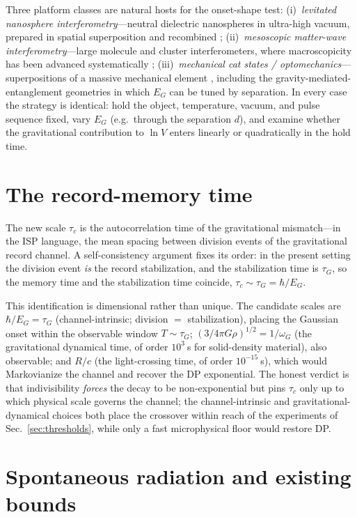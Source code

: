\documentclass[aps,pra,preprint,amsmath,amssymb,nofootinbib,superscriptaddress]{revtex4-2}
\begin{document}
Three platform classes are natural hosts for the onset-shape test:
(i)~\emph{levitated nanosphere interferometry}---neutral dielectric nanospheres
in ultra-high vacuum, prepared in spatial superposition and recombined
\cite{arndt2014}; (ii)~\emph{mesoscopic matter-wave interferometry}---large
molecule and cluster interferometers, where macroscopicity has been advanced
systematically \cite{arndt2014,nimmrichter2013}; (iii)~\emph{mechanical cat
states / optomechanics}---superpositions of a massive mechanical element
\cite{marshall2003}, including the gravity-mediated-entanglement geometries
\cite{bose2017,marletto2017} in which $E_G$ can be tuned by separation. In every
case the strategy is identical: hold the object, temperature, vacuum, and pulse
sequence fixed, vary $E_G$ (e.g.\ through the separation $d$), and examine
whether the gravitational contribution to $\ln V$ enters linearly or
quadratically in the hold time.

\section{The record-memory time}
\label{sec:tauc}

The new scale $\tau_c$ is the autocorrelation time of the gravitational
mismatch---in the ISP language, the mean spacing between division events of the
gravitational record channel. A self-consistency argument fixes its order: in the
present setting the division event \emph{is} the record stabilization, and the
stabilization time is $\tau_G$, so the memory time and the stabilization time
coincide, $\tau_c\sim\tau_G=\hbar/E_G$.

This identification is dimensional rather than unique. The candidate scales are
$\hbar/E_G=\tau_G$ (channel-intrinsic; division $=$ stabilization), placing the
Gaussian onset within the observable window $T\sim\tau_G$;
$(3/4\pi G\rho)^{1/2}=1/\omega_G$ (the gravitational dynamical time, of order
$10^3~$s for solid-density material), also observable; and $R/c$ (the
light-crossing time, of order $10^{-15}~$s), which would Markovianize the channel
and recover the DP exponential. The honest verdict is that indivisibility
\emph{forces} the decay to be non-exponential but pins $\tau_c$ only up to which
physical scale governs the channel; the channel-intrinsic and
gravitational-dynamical choices both place the crossover within reach of the
experiments of Sec.~\ref{sec:thresholds}, while only a fast microphysical floor
would restore DP.

\section{Spontaneous radiation and existing bounds}
\end{document}
